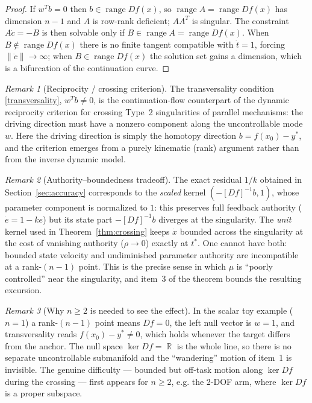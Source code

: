 \documentclass[11pt,american]{article}
\DeclareMathOperator{\R}{\mathbb{R}}
\DeclareMathOperator{\range}{range}
\theoremstyle{definition}
\theoremstyle{plain}
\theoremstyle{remark}
\newtheorem{remark}{Remark}
\begin{document}
\begin{proof}
If $w^T b = 0$ then $b \in \range Df(x)$, so $\range A = \range Df(x)$ has dimension $n-1$ and $A$ is row-rank deficient; $AA^T$ is singular. The constraint $A\dot c = -B$ is then solvable only if $B \in \range A = \range Df(x)$. When $B \notin \range Df(x)$ there is no finite tangent compatible with $\dot t = 1$, forcing $\|\dot c\| \to \infty$; when $B \in \range Df(x)$ the solution set gains a dimension, which is a bifurcation of the continuation curve.
\end{proof}

\begin{remark}[Reciprocity / crossing criterion]
The transversality condition \eqref{transversality}, $w^T b \ne 0$, is the continuation-flow counterpart of the dynamic reciprocity criterion for crossing Type~2 singularities of parallel mechanisms: the driving direction must have a nonzero component along the uncontrollable mode $w$. Here the driving direction is simply the homotopy direction $b = f(x_0) - y^*$, and the criterion emerges from a purely kinematic (rank) argument rather than from the inverse dynamic model.
\end{remark}

\begin{remark}[Authority--boundedness tradeoff]\label{rem:tradeoff}
The exact residual $1/k$ obtained in Section~\ref{sec:accuracy} corresponds to the \emph{scaled} kernel $(-[Df]^{-1}b, 1)$, whose parameter component is normalized to $1$: this preserves full feedback authority ($\dot e = 1 - ke$) but its state part $-[Df]^{-1}b$ diverges at the singularity. The \emph{unit} kernel used in Theorem~\ref{thm:crossing} keeps $\dot x$ bounded across the singularity at the cost of vanishing authority ($\rho \to 0$) exactly at $t^*$. One cannot have both: bounded state velocity and undiminished parameter authority are incompatible at a rank-$(n-1)$ point. This is the precise sense in which $\mu$ is ``poorly controlled'' near the singularity, and item~3 of the theorem bounds the resulting excursion.
\end{remark}

\begin{remark}[Why $n \ge 2$ is needed to see the effect]
In the scalar toy example ($n = 1$) a rank-$(n-1)$ point means $Df = 0$, the left null vector is $w = 1$, and transversality reads $f(x_0) - y^* \ne 0$, which holds whenever the target differs from the anchor. The null space $\ker Df = \R$ is the whole line, so there is no separate uncontrollable submanifold and the ``wandering'' motion of item~1 is invisible. The genuine difficulty — bounded but off-task motion along $\ker Df$ during the crossing — first appears for $n \ge 2$, e.g. the 2-DOF arm, where $\ker Df$ is a proper subspace.
\end{remark}
\end{document}

